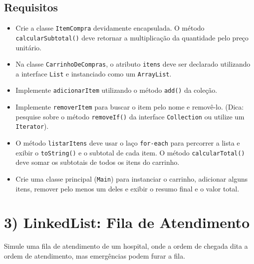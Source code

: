 \documentclass[12pt]{article}
\begin{document}
\subsection*{Requisitos}
\begin{itemize}
    \item Crie a classe \texttt{ItemCompra} devidamente encapsulada. O método \texttt{calcularSubtotal()} deve retornar a multiplicação da quantidade pelo preço unitário.
    \item Na classe \texttt{CarrinhoDeCompras}, o atributo \texttt{itens} deve ser declarado utilizando a interface \texttt{List} e instanciado como um \texttt{ArrayList}.
    \item Implemente \texttt{adicionarItem} utilizando o método \texttt{add()} da coleção.
    \item Implemente \texttt{removerItem} para buscar o item pelo nome e removê-lo. (Dica: pesquise sobre o método \texttt{removeIf()} da interface \texttt{Collection} ou utilize um \texttt{Iterator}).
    \item O método \texttt{listarItens} deve usar o laço \texttt{for-each} para percorrer a lista e exibir o \texttt{toString()} e o subtotal de cada item. O método \texttt{calcularTotal()} deve somar os subtotais de todos os itens do carrinho.
    \item Crie uma classe principal (\texttt{Main}) para instanciar o carrinho, adicionar alguns itens, remover pelo menos um deles e exibir o resumo final e o valor total.
\end{itemize}

\section*{3) LinkedList: Fila de Atendimento}
Simule uma fila de atendimento de um hospital, onde a ordem de chegada dita a ordem de atendimento, mas emergências podem furar a fila.

\begin{center}
\end{center}
\end{document}
